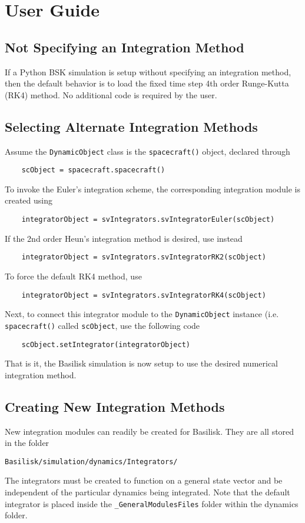 
\section{User Guide}

\subsection{Not Specifying an Integration Method}
If a Python BSK simulation is setup without specifying an integration method, then the default behavior is to load the fixed time step 4th order Runge-Kutta (RK4) method.  No additional code is required by the user.


\subsection{Selecting Alternate Integration Methods}
Assume the {\tt DynamicObject} class is the {\tt spacecraft()} object, declared through
\begin{verbatim}
	scObject = spacecraft.spacecraft()
\end{verbatim}
To invoke the Euler's  integration scheme, the corresponding integration module is created using
\begin{verbatim}
	integratorObject = svIntegrators.svIntegratorEuler(scObject)
\end{verbatim}
If the 2nd order Heun's integration method is desired, use instead
\begin{verbatim}
	integratorObject = svIntegrators.svIntegratorRK2(scObject)
\end{verbatim}
To force the default RK4 method, use
\begin{verbatim}
	integratorObject = svIntegrators.svIntegratorRK4(scObject)
\end{verbatim}

Next, to connect this integrator module to the {\tt DynamicObject} instance (i.e. {\tt spacecraft()} called {\tt scObject}, use the following code
\begin{verbatim}
	scObject.setIntegrator(integratorObject)
\end{verbatim}
That is it, the Basilisk simulation is now setup to use the desired numerical  integration method.


\subsection{Creating New Integration Methods}
New integration modules can readily be created for Basilisk. They are all stored in the folder
\begin{verbatim}
Basilisk/simulation/dynamics/Integrators/
\end{verbatim}
The integrators must be created to function on a general state vector and be independent of the particular dynamics being integrated. Note that the default integrator is placed inside the {\tt\_GeneralModulesFiles} folder within the dynamics folder.